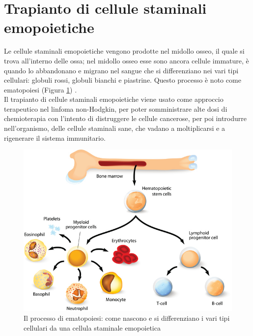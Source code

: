 \section{Trapianto di cellule staminali emopoietiche}

Le cellule staminali emopoietiche vengono prodotte nel midollo osseo, il quale si trova all’interno delle ossa; 
nel midollo osseo esse sono ancora cellule immature, è quando lo abbandonano e migrano nel sangue che si 
differenziano nei vari tipi cellulari: globuli rossi, globuli bianchi e piastrine. 
Questo processo è noto come ematopoiesi (Figura \ref{fig:FIGURE_3.14}) \cite{TRAPIANTO}.\\
Il trapianto di cellule staminali emopoietiche viene usato come approccio terapeutico nel linfoma non-Hodgkin, per 
poter somministrare alte dosi di chemioterapia con l'intento di distruggere le cellule cancerose, per poi introdurre 
nell’organismo, delle cellule staminali sane, che vadano a moltiplicarsi e a rigenerare il sistema immunitario.

\begin{figure}[H]
    \begin{center}
    \includegraphics[width=0.5\columnwidth]{img/transplant.jpeg}
    \vspace{-3mm}
    \end{center}
    \caption{Il processo di ematopoiesi: come nascono e si differenziano i 
    vari tipi cellulari da una cellula staminale emopoietica
    \cite{img35}}
    \label{fig:FIGURE_3.14}
\end{figure}

